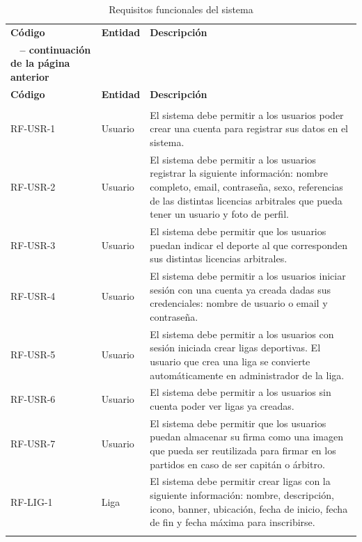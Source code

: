 {\renewcommand{\arraystretch}{1.25}
    \begin{xltabular}{\textwidth}{>{\RaggedRight}p{1.7cm} p{1.8cm} >{\RaggedRight\arraybackslash}X}
        \caption{Requisitos funcionales del sistema}\label{tab:rf}\\
        \lightrule
        \textbf{Código} & \textbf{Entidad} & \textbf{Descripción} \\
        \lightrule
        \endfirsthead
        {{\bfseries \tablename\ \thetable{} -- continuación de la página anterior}} \\
        \lightrule
        \textbf{Código} & \textbf{Entidad} & \textbf{Descripción} \\
        \lightrule
        \endhead
         \\ \lightrule
        \endfoot
        \lightrule
        \endlastfoot
        RF-USR-1 & Usuario & El sistema debe permitir a los usuarios poder crear una cuenta para registrar sus datos en el sistema. \\ \lightrule
        RF-USR-2 & Usuario & El sistema debe permitir a los usuarios registrar la siguiente información: nombre completo, email, contraseña, sexo, referencias de las distintas licencias arbitrales que pueda tener un usuario y foto de perfil. \\ \lightrule
        RF-USR-3 & Usuario & El sistema debe permitir que los usuarios puedan indicar el deporte al que corresponden sus distintas licencias arbitrales. \\ \lightrule
        RF-USR-4 & Usuario & El sistema debe permitir a los usuarios iniciar sesión con una cuenta ya creada dadas sus credenciales: nombre de usuario o email y contraseña. \\ \lightrule
        RF-USR-5 & Usuario & El sistema debe permitir a los usuarios con sesión iniciada crear ligas deportivas. El usuario que crea una liga se convierte automáticamente en administrador de la liga. \\ \lightrule
        RF-USR-6 & Usuario & El sistema debe permitir a los usuarios sin cuenta poder ver ligas ya creadas. \\ \lightrule
        RF-USR-7 & Usuario & El sistema debe permitir que los usuarios puedan almacenar su firma como una imagen que pueda ser reutilizada para firmar en los partidos en caso de ser capitán o árbitro. \\ \lightrule
        RF-LIG-1 & Liga & El sistema debe permitir crear ligas con la siguiente información: nombre, descripción, icono, banner, ubicación, fecha de inicio, fecha de fin y fecha máxima para inscribirse. \\ \lightrule

\end{xltabular}}
